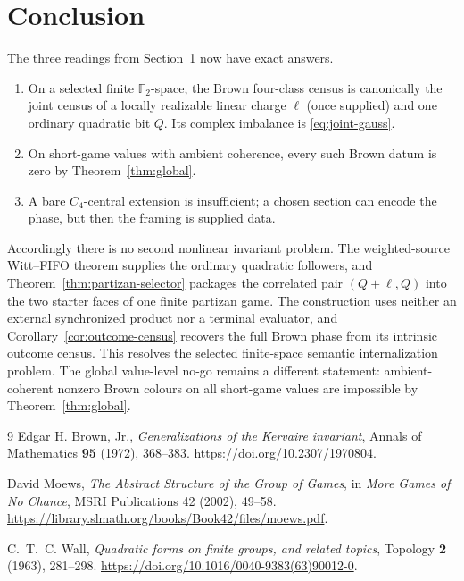 \documentclass[11pt]{article}
\theoremstyle{definition}
\theoremstyle{remark}
\newcommand{\F}{\mathbb F}
\begin{document}
\section{Conclusion}

The three readings from Section~1 now have exact answers.
\begin{enumerate}[label=(\arabic*),leftmargin=2.5em]
\item On a selected finite $\F_2$-space, the Brown four-class
      census is canonically the joint census of a locally realizable linear
      charge $\ell$ (once supplied) and one ordinary quadratic bit $Q$.  Its complex imbalance is
      \eqref{eq:joint-gauss}.
\item On short-game values with ambient coherence, every such
      Brown datum is zero by Theorem~\ref{thm:global}.
\item A bare $C_4$-central extension is insufficient; a chosen
      section can encode the phase, but then the framing is supplied data.
\end{enumerate}

Accordingly there is no second nonlinear invariant problem.  The
weighted-source Witt--FIFO theorem supplies the ordinary quadratic followers,
and Theorem~\ref{thm:partizan-selector} packages the correlated pair
$(Q+\ell,Q)$ into the two starter faces of one finite partizan game.  The
construction uses neither an external synchronized product nor a terminal
evaluator, and Corollary~\ref{cor:outcome-census} recovers the full Brown phase
from its intrinsic outcome census.  This resolves the selected finite-space
semantic internalization problem.  The global value-level no-go remains a
different statement: ambient-coherent nonzero Brown colours on all short-game
values are impossible by Theorem~\ref{thm:global}.

\begin{thebibliography}{9}
Edgar H. Brown, Jr.,
\emph{Generalizations of the Kervaire invariant},
Annals of Mathematics \textbf{95} (1972), 368--383.
\url{https://doi.org/10.2307/1970804}.

David Moews,
\emph{The Abstract Structure of the Group of Games},
in \emph{More Games of No Chance}, MSRI Publications 42 (2002), 49--58.
\url{https://library.slmath.org/books/Book42/files/moews.pdf}.

C.~T.~C. Wall,
\emph{Quadratic forms on finite groups, and related topics},
Topology \textbf{2} (1963), 281--298.
\url{https://doi.org/10.1016/0040-9383(63)90012-0}.
\end{thebibliography}
\end{document}
